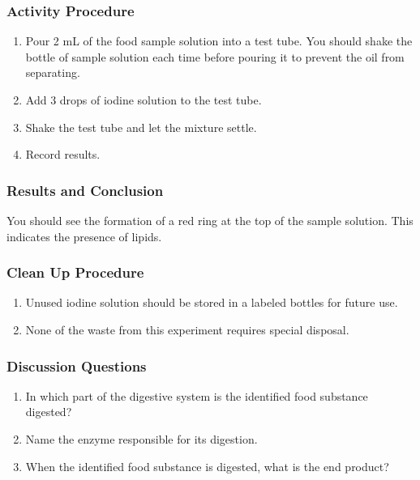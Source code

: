 \subsubsection*{Activity Procedure}
\begin{enumerate}
\item{Pour 2 mL of the food sample solution into a test tube. You should shake the bottle of sample solution each time before pouring it to prevent the oil from separating.}
\item{Add 3 drops of iodine solution to the test tube.}
\item{Shake the test tube and let the mixture settle.}
\item{Record results.}
\end{enumerate}

\subsubsection*{Results and Conclusion}
You should see the formation of a red ring at the top of the sample solution. This indicates the presence of lipids.

\subsubsection*{Clean Up Procedure}
\begin{enumerate}
\item{Unused iodine solution should be stored in a labeled bottles for future use.}
\item{None of the waste from this experiment requires special disposal.}
\end{enumerate}

\subsubsection*{Discussion Questions}
\begin{enumerate}
\item{In which part of the digestive system is the identified food substance digested?}
\item{Name the enzyme responsible for its digestion.}
\item{When the identified food substance is digested, what is the end product?}
\end{enumerate}

